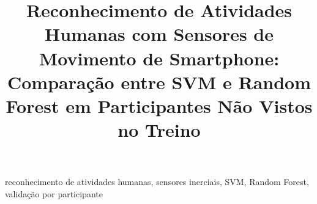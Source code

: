 \documentclass[conference]{IEEEtran}
\begin{document}
\title{Reconhecimento de Atividades Humanas com Sensores de Movimento de Smartphone: Comparação entre SVM e Random Forest em Participantes Não Vistos no Treino}

\author{
}

\maketitle

\begin{abstract}
\end{abstract}

\begin{IEEEkeywords}
reconhecimento de atividades humanas, sensores inerciais, SVM, Random Forest, validação por participante
\end{IEEEkeywords}











\end{document}
